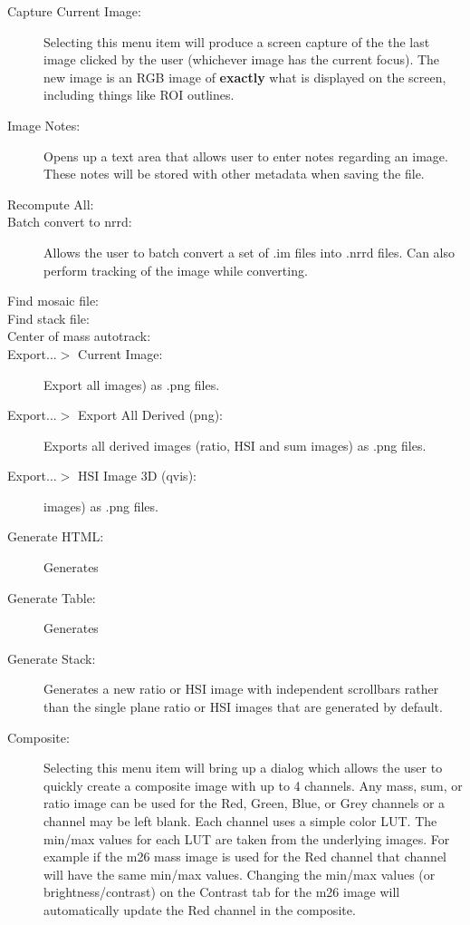 \documentclass{article}
\begin{document}
\begin{description}
\begin{description}
	\item[Capture Current Image:] Selecting this menu item will produce a screen capture of the 
	the last image clicked by the user (whichever image has the current focus). 
	The new image is an RGB image of \textbf{exactly} what is displayed on the screen, 
	including things like ROI outlines.
	
	\item[Image Notes:] Opens up a text area that allows user to enter notes regarding an image.
	These notes will be stored with other metadata when saving the file.
	
	\item[Recompute All:] 
	
	\item[Batch convert to nrrd:] Allows the user to batch convert a set of .im files into
	.nrrd files. Can also perform tracking of the image while converting.
	
	\item[Find mosaic file:] 
	
	\item[Find stack file:] 
	
	\item[Center of mass autotrack:] 
	
	\item[Export...$>$ Current Image:] 
	Export all images) as .png files.
	
	\item[Export...$>$ Export All Derived (png):] Exports all derived images (ratio, HSI and sum
	images) as .png files.
	
	\item[Export...$>$ HSI Image 3D (qvis):]
	images) as .png files.
	
	\item[Generate HTML:] Generates 
	
	\item[Generate Table:] Generates 
	
	\item[Generate Stack:] Generates a new ratio or HSI image with independent scrollbars 
	rather than the single plane ratio or HSI images that are generated by default.
	
	\item[Composite:] Selecting this menu item will bring up a dialog which allows the user to quickly create a composite image with up to 4 channels.  Any mass, sum, or ratio image can be used for the Red, Green, Blue, or Grey channels or a channel may be left blank.  Each channel uses a simple color LUT.  The min/max values for each LUT are taken from the underlying images.  For example if the m26 mass image is used for the Red channel that channel will have the same min/max values.  Changing the min/max values (or brightness/contrast) on the Contrast tab for the m26 image will automatically update the Red channel in the composite.
	

\end{description}
\end{description}
\end{document}
